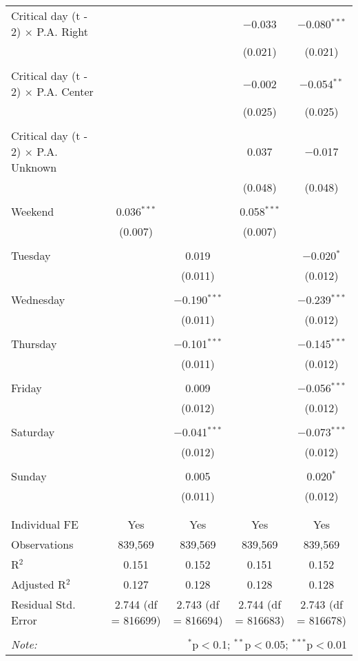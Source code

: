 \documentclass[
]{article}
\begin{document}
\begin{table}[!htbp]
{\begin{tabular}{@{\extracolsep{5pt}}lcccc}
 Critical day (t - 2) $\times$ P.A. Right &  &  & $-$0.033 & $-$0.080$^{***}$ \\ 
  &  &  & (0.021) & (0.021) \\ 
  & & & & \\ 
 Critical day (t - 2) $\times$ P.A. Center &  &  & $-$0.002 & $-$0.054$^{**}$ \\ 
  &  &  & (0.025) & (0.025) \\ 
  & & & & \\ 
 Critical day (t - 2) $\times$ P.A. Unknown &  &  & 0.037 & $-$0.017 \\ 
  &  &  & (0.048) & (0.048) \\ 
  & & & & \\ 
 Weekend & 0.036$^{***}$ &  & 0.058$^{***}$ &  \\ 
  & (0.007) &  & (0.007) &  \\ 
  & & & & \\ 
 Tuesday &  & 0.019 &  & $-$0.020$^{*}$ \\ 
  &  & (0.011) &  & (0.012) \\ 
  & & & & \\ 
 Wednesday &  & $-$0.190$^{***}$ &  & $-$0.239$^{***}$ \\ 
  &  & (0.011) &  & (0.012) \\ 
  & & & & \\ 
 Thursday &  & $-$0.101$^{***}$ &  & $-$0.145$^{***}$ \\ 
  &  & (0.011) &  & (0.012) \\ 
  & & & & \\ 
 Friday &  & 0.009 &  & $-$0.056$^{***}$ \\ 
  &  & (0.012) &  & (0.012) \\ 
  & & & & \\ 
 Saturday &  & $-$0.041$^{***}$ &  & $-$0.073$^{***}$ \\ 
  &  & (0.012) &  & (0.012) \\ 
  & & & & \\ 
 Sunday &  & 0.005 &  & 0.020$^{*}$ \\ 
  &  & (0.011) &  & (0.012) \\ 
  & & & & \\ 
\hline \\[-1.8ex] 
Individual FE & Yes & Yes & Yes & Yes \\ 
Observations & 839,569 & 839,569 & 839,569 & 839,569 \\ 
R$^{2}$ & 0.151 & 0.152 & 0.151 & 0.152 \\ 
Adjusted R$^{2}$ & 0.127 & 0.128 & 0.128 & 0.128 \\ 
Residual Std. Error & 2.744 (df = 816699) & 2.743 (df = 816694) & 2.744 (df = 816683) & 2.743 (df = 816678) \\ 
\hline 
\hline \\[-1.8ex] 
\textit{Note:}  & \multicolumn{4}{r}{$^{*}$p$<$0.1; $^{**}$p$<$0.05; $^{***}$p$<$0.01} \\ 
\end{tabular}
} 
\end{table}
\end{document}

